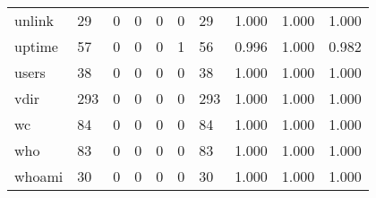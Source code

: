 \begin{longtable}{lp{1.3cm}p{1.3cm}p{1.3cm}p{1.3cm}p{1.3cm}p{1.3cm}p{1.3cm}p{1.3cm}p{1.3cm}}
unlink    &                     29 &                                             0 &                                            0 &                                           0 &                                            0 &                                         29 &                                1.000 &                                  1.000 &                                1.000 \\
uptime    &                     57 &                                             0 &                                            0 &                                           0 &                                            1 &                                         56 &                                0.996 &                                  1.000 &                                0.982 \\
users     &                     38 &                                             0 &                                            0 &                                           0 &                                            0 &                                         38 &                                1.000 &                                  1.000 &                                1.000 \\
vdir      &                    293 &                                             0 &                                            0 &                                           0 &                                            0 &                                        293 &                                1.000 &                                  1.000 &                                1.000 \\
wc        &                     84 &                                             0 &                                            0 &                                           0 &                                            0 &                                         84 &                                1.000 &                                  1.000 &                                1.000 \\
who       &                     83 &                                             0 &                                            0 &                                           0 &                                            0 &                                         83 &                                1.000 &                                  1.000 &                                1.000 \\
whoami    &                     30 &                                             0 &                                            0 &                                           0 &                                            0 &                                         30 &                                1.000 &                                  1.000 &                                1.000 \\

\end{longtable}
